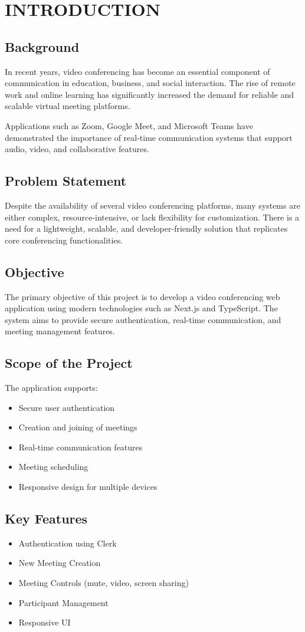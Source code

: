 \chapter{INTRODUCTION}

\section{Background}

In recent years, video conferencing has become an essential component of communication in education, business, and social interaction. The rise of remote work and online learning has significantly increased the demand for reliable and scalable virtual meeting platforms.

Applications such as Zoom, Google Meet, and Microsoft Teams have demonstrated the importance of real-time communication systems that support audio, video, and collaborative features.

\section{Problem Statement}

Despite the availability of several video conferencing platforms, many systems are either complex, resource-intensive, or lack flexibility for customization. There is a need for a lightweight, scalable, and developer-friendly solution that replicates core conferencing functionalities.

\section{Objective}

The primary objective of this project is to develop a video conferencing web application using modern technologies such as Next.js and TypeScript. The system aims to provide secure authentication, real-time communication, and meeting management features.

\section{Scope of the Project}

The application supports:
\begin{itemize}
\item Secure user authentication
\item Creation and joining of meetings
\item Real-time communication features
\item Meeting scheduling
\item Responsive design for multiple devices
\end{itemize}

\section{Key Features}

\begin{itemize}
\item Authentication using Clerk
\item New Meeting Creation
\item Meeting Controls (mute, video, screen sharing)
\item Participant Management
\item Responsive UI
\end{itemize}